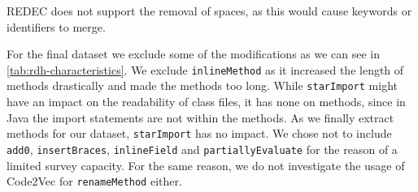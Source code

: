 \documentclass[%
class=scrreprt,
chapterprefix=false,%
open=right,%
twoside=false,%
paper=a4,%
logofile={Logo\_zentral\_farbig\_EN.png},%
thesistype=master,%
UKenglish,%
]{se2thesis}
\theoremstyle{definition}
\newcommand{\rdh}{REDEC\xspace}
\begin{document}
	
	\rdh does not support the removal of spaces, as this would cause keywords or identifiers to merge.
	

	For the final dataset we exclude some of the modifications as we can see in \autoref{tab:rdh-characteristics}.
	We exclude \texttt{inlineMethod} as it increased the length of methods drastically and made the methods too long.
	While \texttt{starImport} might have an impact on the readability of class files, it has none on methods, since in Java the import statements are not within the methods. As we finally extract methods for our dataset, \texttt{starImport} has no impact.
	We chose not to include \texttt{add0}, \texttt{insertBraces}, \texttt{inlineField} and \texttt{partiallyEvaluate} for the reason of a limited survey capacity.
	For the same reason, we do not investigate the usage of Code2Vec for \texttt{renameMethod} either.
\end{document}
